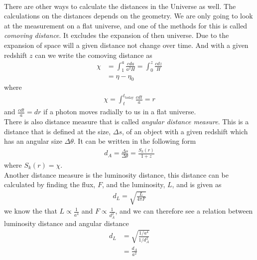 \documentclass{article}
\begin{document}
\begin{multicols}{2}
\\
There are other ways to calculate the distances in the Universe as well. The calculations on the distances depends on the geometry.
 We are only going to look at the measurement on a flat universe, and one of the methods for this is called \emph{comoving distance}. It excludes the expansion of then universe. Due to the expansion of space will a given distance not change over time. And with a given redshift $z$ can we write the comoving distance as
\begin{align}
    \chi &=\int_1^a\frac{cda}{a^2H}=\int_0^z\frac{cdz}{H}\\
    &=\eta-\eta_0
\end{align}
where
\begin{align}
    \chi=\int_t^{t_\text{today}}\frac{cdt}{a}=r
\end{align}
and $\frac{cdt}{a}=dr$ if a photon moves radially to us in a flat universe.
\\
There is also distance measure that is called \emph{angular distance measure}. This is a distance that is defined at the size, $\Delta s$, of an object with a given redshift which has an angular size $\Delta \theta$. It can be written in the following form
\begin{align}
    d_A=\frac{\Delta s}{\Delta \theta}=\frac{S_k(r)}{1+z}
\end{align}
where $S_k(r)=\chi$.\\
Another distance measure is the luminosity distance, this distance can be calculated by finding the flux, $F$, and the luminosity, $L$, and is given as
\begin{align}
    d_L=\sqrt{\frac{L}{4\pi F}}
\end{align}
we know the that $L\propto \frac{1}{a^4}$ and $F\propto\frac{1}{d_A^2}$, and we can therefore see a relation between luminosity distance and angular distance 
\begin{align}
    d_L&=\sqrt{\frac{1/a^4}{1/d_A^2}}\\
    &=\frac{d_A}{a^2}
\end{align}


\end{multicols}
\end{document}
